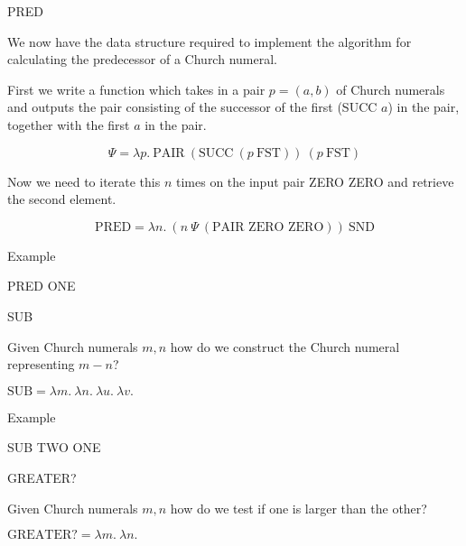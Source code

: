 \documentclass{beamer}
\begin{document}
\begin{frame}{PRED}
    
  We now have the data structure required to implement the algorithm for calculating the predecessor of a Church numeral. 
  
  \vspace{0.5cm}
  
  First we write a function which takes in a pair $p = (a,b)$ of Church numerals and outputs the pair consisting of the successor of the first (SUCC $a$) in the pair, together with the first $a$ in the pair.
  
  $$ \Psi = \lambda p. \ \text{PAIR} \ (\text{SUCC} \ (p \ \text{FST})) \ (p \ \text{FST}) $$
  
  Now we need to iterate this $n$ times on the input pair ZERO ZERO and retrieve the second element.
  
  $$\text{PRED} = \lambda n. \ (n \ \Psi \ (\text{PAIR ZERO ZERO})) \ \text{SND}$$
  
  
\end{frame}

\begin{frame}{Example}
  
  PRED ONE
  \vspace{6cm}
   
\end{frame}

\begin{frame}{SUB}

  Given Church numerals $m,n$ how do we construct the Church numeral representing $m-n$?
  
  \vspace{0.3cm}
  
  $\text{SUB} = \lambda m. \ \lambda n. \ \lambda u. \ \lambda v. \ $
  
  \vspace{6cm}
  
\end{frame}

\begin{frame}{Example}
  
  SUB TWO ONE
  \vspace{6cm}
       
\end{frame}

\begin{frame}{GREATER?}

  Given Church numerals $m,n$ how do we test if one is larger than the other?
  
  \vspace{0.3cm}
  
  $\text{GREATER?} = \lambda m. \ \lambda n. \ $
  
  \vspace{6cm}  

\end{frame}
\end{document}
